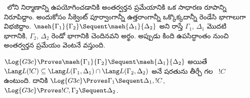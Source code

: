 \documentclass[../../../include/open-logic-section]{subfiles}
\begin{document}
~లోని  నిర్మాణాన్ని ఉపయోగించడానికి అంతర్వర్తన ప్రమేయానికి ఒక సాధారణ రూపాన్ని నిరూపిద్దాం. అందుకోసం సీక్వెంట్‌ పూర్వాంగాన్నీ ఉత్తరాంగాన్నీ ఒక్కొక్కదాన్నీ రెండేసి భాగాలుగా విభజిద్దాం. $\maeh{\Gamma_1}{\Gamma_2} \Sequent
\maeh{\Delta_1}{\Delta_2}$ అని రాస్తే $\Gamma_1$, $\Delta_1$ మొదటి భాగానికి, $\Gamma_2$, $\Delta_2$ రెండో భాగానికి చెందినవని అర్థం. అప్పుడు కింది ఉపసిద్ధాంతం నుంచి అంతర్వర్తన ప్రమేయం వెంటనే వస్తుంది.

\begin{lem}[మహేరా ఉపసిద్ధాంతం] $\Log{G3c}
\Proves \maeh{\Gamma_1}{\Gamma_2} \Sequent \maeh{\Delta_1}{\Delta_2}$ అయితే $\Lang L(!C)
\subseteq \Lang L(\Gamma_1,
\Delta_1) \cap \Lang L(\Gamma_2, \Delta_2)$ అనే షరతును తీర్చే  గల ~$!C$ ఉంటుంది. దానికి $\Log{G3c}
\Proves \Gamma_1 \Sequent \Delta_1, !C$, $\Log{G3c} \Proves !C,
\Gamma_2 \Sequent \Delta_2$.
\end{lem}
\end{document}
